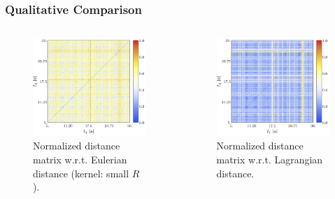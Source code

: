 \documentclass[9pt, english]{beamer}
\begin{document}
\begin{frame}[fragile]
\frametitle{Qualitative Comparison}
\begin{columns}[t]
\begin{column}{0.56\textwidth}
\begin{figure}
\centering
\includegraphics[width=1\textwidth]{field_distance_matrix_5_30_12_12_12.jpg}
\caption{Normalized distance matrix w.r.t. Eulerian distance (kernel: small \(R\)).}
\end{figure}
\end{column}
\begin{column}{0.56\textwidth}
\begin{figure}
\centering
\includegraphics[width=1\textwidth]{discrete_distance_matrix_5_30_6000_6000.jpg}
\caption{Normalized distance matrix w.r.t. Lagrangian distance.}
\end{figure}
\end{column}
\end{columns}
\end{frame}
\end{document}
